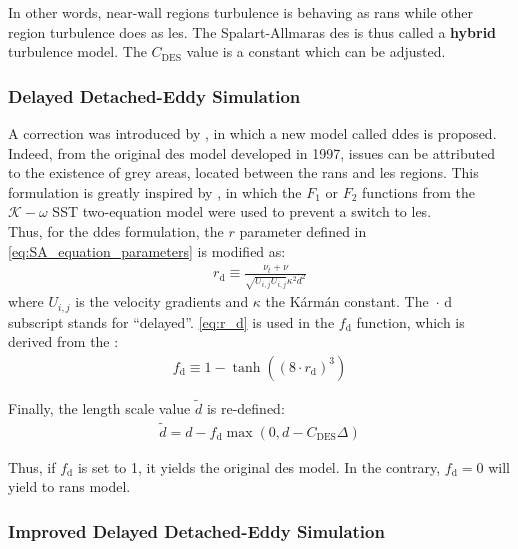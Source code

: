 \documentclass[12pt,twoside]{report}
\newcommand{\kom}{$\mathcal{K}-\omega$ }
\begin{document}
In other words, near-wall regions turbulence is behaving as \gls{rans} while other region turbulence does as \gls{les}. The Spalart-Allmaras \gls{des} is thus called a \textbf{hybrid} turbulence model. The $C_{\text{DES}}$ value is a constant which can be adjusted.

\vspace{0.3cm}
\subsubsection{Delayed Detached-Eddy Simulation}

A correction was introduced by \cite{spalart_new_2006}, in which a new model called \gls{ddes} is proposed. Indeed, from the original \gls{des} model developed in 1997, issues can be attributed to the existence of grey areas, located between the \gls{rans} and \gls{les} regions. This formulation is greatly inspired by \cite{menter_kuntz_2004}, in which the $F_1$ or $F_2$ functions from the \kom SST two-equation model were used to prevent a switch to \gls{les}. \\

Thus, for the \gls{ddes} formulation, the $r$ parameter defined in \autoref{eq:SA_equation_parameters} is modified as:
\begin{align}
    r_\mathrm{d} \equiv \frac{\nu_t + \nu}{\sqrt{U_{i,j}U_{i,j}} \kappa^2 d^2} \label{eq:r_d}
\end{align}
where $U_{i,j}$ is the velocity gradients and $\kappa$ the K\'{a}rm\'{a}n constant. The $\cdot_\,{\mathrm{d}}$ subscript stands for ``delayed''. \autoref{eq:r_d} is used in the $f_{\mathrm{d}}$ function, which is derived from the :
\begin{align}
    f_{\mathrm{d}} \equiv 1 - \tanh\left( \left( 8\cdot r_\mathrm{d} \right)^3 \right) \label{eq:f_d}
\end{align}

Finally, the length scale value $\tilde{d}$ is re-defined:
\begin{align}
    \tilde{d} = d- f_\mathrm{d} \max \left( 0,d-C_{\text{DES}}\Delta \right)
\end{align}

Thus, if $f_\mathrm{d}$ is set to 1, it yields the original \gls{des} model. In the contrary, $f_\mathrm{d}=0$ will yield to \gls{rans} model.

\vspace{0.3cm}

\subsubsection{Improved Delayed Detached-Eddy Simulation}
\end{document}
